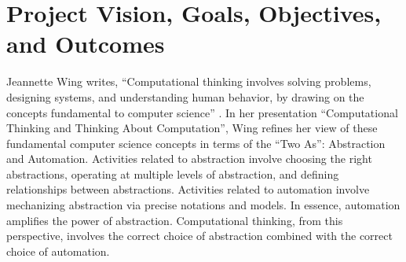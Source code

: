 

\section{Project Vision, Goals, Objectives, and Outcomes}



Jeannette Wing writes, ``Computational thinking involves solving problems,
designing systems, and understanding human behavior, by drawing on the
concepts fundamental to computer science'' \citep{Wing06}.  In her
presentation ``Computational Thinking and Thinking About Computation'',
Wing refines her view of these fundamental computer science concepts in
terms of the ``Two As'': Abstraction and Automation.  Activities related to
abstraction involve choosing the right abstractions, operating at multiple
levels of abstraction, and defining relationships between abstractions.
Activities related to automation involve mechanizing abstraction via
precise notations and models.  In essence, automation amplifies the power
of abstraction.  Computational thinking, from this perspective, involves
the correct choice of abstraction combined with the correct choice of
automation.

